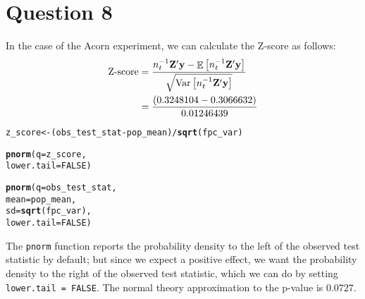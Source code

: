 \documentclass[11pt]{article}\usepackage[]{graphicx}\usepackage[]{color}
\makeatletter
\newcommand{\hlnum}[1]{\textcolor[rgb]{0.686,0.059,0.569}{#1}}%
\newcommand{\hlopt}[1]{\textcolor[rgb]{0,0,0}{#1}}%
\newcommand{\hlstd}[1]{\textcolor[rgb]{0.345,0.345,0.345}{#1}}%
\newcommand{\hlkwb}[1]{\textcolor[rgb]{0.69,0.353,0.396}{#1}}%
\newcommand{\hlkwc}[1]{\textcolor[rgb]{0.333,0.667,0.333}{#1}}%
\newcommand{\hlkwd}[1]{\textcolor[rgb]{0.737,0.353,0.396}{\textbf{#1}}}%
\newenvironment{kframe}{%
 \def\at@end@of@kframe{}%
 \ifinner\ifhmode%
  \def\at@end@of@kframe{\end{minipage}}%
  \begin{minipage}{\columnwidth}%
 \fi\fi%
 \def\FrameCommand##1{\hskip\@totalleftmargin \hskip-\fboxsep
 \colorbox{shadecolor}{##1}\hskip-\fboxsep
     \hskip-\linewidth \hskip-\@totalleftmargin \hskip\columnwidth}%
 \MakeFramed {\advance\hsize-\width
   \@totalleftmargin\z@ \linewidth\hsize
   \@setminipage}}%
 {\par\unskip\endMakeFramed%
 \at@end@of@kframe}
\newenvironment{knitrout}{}{} %
\theoremstyle{newstyle}
\DeclareMathOperator{\E}{\mathbb{E}}
\DeclareMathOperator{\Var}{\rm{Var}}
\makeatother
\begin{document}
\section{Question 8}

In the case of the Acorn experiment, we can calculate the Z-score as follows:
\begin{align*}
\text{Z-score} & = \frac{n_t^{-1}\mathbf{Z}^{\prime}\mathbf{y} - \E\left[n_t^{-1}\mathbf{Z}^{\prime}\mathbf{y}\right]}{\sqrt{\Var\left[n_t^{-1}\mathbf{Z}^{\prime}\mathbf{y}\right]}} \\
& = \frac{\left(0.3248104 - 0.3066632\right)}{0.01246439}
\end{align*}

\begin{knitrout}
\color{fgcolor}\begin{kframe}
\begin{alltt}
\hlstd{z_score} \hlkwb{<-} \hlstd{(obs_test_stat} \hlopt{-} \hlstd{pop_mean)} \hlopt{/} \hlkwd{sqrt}\hlstd{(fpc_var)}
\end{alltt}


{\ttfamily\noindent\bfseries\color{errorcolor}{\#\# Error in eval(expr, envir, enclos): object 'obs\_test\_stat' not found}}\begin{alltt}
\hlkwd{pnorm}\hlstd{(}\hlkwc{q} \hlstd{= z_score,}
      \hlkwc{lower.tail} \hlstd{=} \hlnum{FALSE}\hlstd{)}
\end{alltt}


{\ttfamily\noindent\bfseries\color{errorcolor}{\#\# Error in pnorm(q = z\_score, lower.tail = FALSE): object 'z\_score' not found}}\begin{alltt}
\hlkwd{pnorm}\hlstd{(}\hlkwc{q} \hlstd{= obs_test_stat,}
      \hlkwc{mean} \hlstd{= pop_mean,}
      \hlkwc{sd} \hlstd{=} \hlkwd{sqrt}\hlstd{(fpc_var),}
      \hlkwc{lower.tail} \hlstd{=} \hlnum{FALSE}\hlstd{)}
\end{alltt}


{\ttfamily\noindent\bfseries\color{errorcolor}{\#\# Error in pnorm(q = obs\_test\_stat, mean = pop\_mean, sd = sqrt(fpc\_var), : object 'obs\_test\_stat' not found}}\end{kframe}
\end{knitrout}

The \texttt{pnorm} function reports the probability density to the left of the observed test statistic by default; but since we expect a positive effect, we want the probability density to the right of the observed test statistic, which we can do by setting \texttt{lower.tail = FALSE}. The normal theory approximation to the p-value is $0.0727$. 
\end{document}
